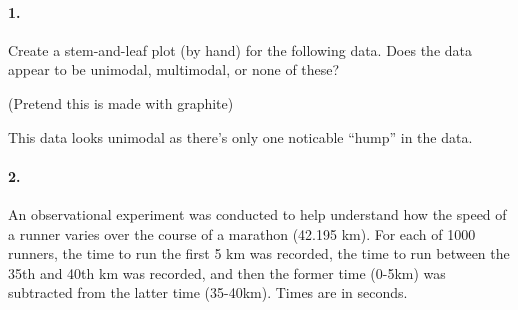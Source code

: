 

\usepackage[]{mdframed}


\renewcommand\classname{STAT F300 Statistics, Dr. Short}

\renewcommand\assignment{Worksheet 1, due Friday, January 20, 4:15 pm}



    \paragraph*{1.} 
    Create a stem-and-leaf plot (by hand) for the following data. Does the data appear to be unimodal, multimodal, or none of these?

    \begin{mdframed}
    \begin{center}
        (Pretend this is made with graphite)
    \end{center}
    
    This data looks unimodal as there's only one noticable ``hump'' in the data.
    \end{mdframed}

    \paragraph*{2.}

    An observational experiment was conducted to help understand how the speed of a runner varies over the course of a marathon (42.195 km). For each of 1000 runners, the time to run the first 5 km was recorded, the time to run between the 35th and 40th km was recorded, and then the former time (0-5km) was subtracted from the latter time (35-40km). Times are in seconds.

